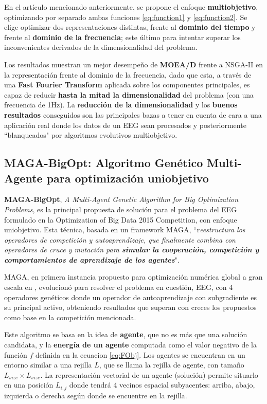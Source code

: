 En el artículo mencionado anteriormente, se propone el enfoque \textbf{multiobjetivo}, optimizando por separado ambas funciones \ref{eq:function1} y \ref{eq:function2}. Se elige optimizar dos representaciones distintas, frente al \textbf{dominio del tiempo} y frente al \textbf{dominio de la frecuencia}; este último para intentar superar los inconvenientes derivados de la dimensionalidad del problema.

Los resultados muestran un mejor desempeño de \textbf{MOEA/D} frente a NSGA-II en la representación frente al dominio de la frecuencia, dado que esta, a través de una \textbf{Fast Fourier Transform} aplicada sobre los componentes principales, es capaz de reducir \textbf{hasta la mitad la dimensionalidad} del problema (con una frecuencia de 1Hz). La r\textbf{educción de la dimensionalidad} y los\textbf{ buenos resultados} conseguidos son las principales bazas a tener en cuenta de cara a una aplicación real donde los datos de un EEG sean procesados y posteriormente ``blanqueados" por algoritmos evolutivos multiobjetivo.

\subsection{MAGA-BigOpt: Algoritmo Genético Multi-Agente para optimización uniobjetivo}

\textbf{MAGA-BigOpt}, \textit{A Multi-Agent Genetic Algorithm for Big Optimization Problems}\cite{MAGA-BigOpt}, es la principal propuesta de solución para el problema del EEG formulado en la Optimization of Big Data 2015 Competition, con enfoque uniobjetivo. Esta técnica, basada en un framework MAGA, ``r\textit{eestructura los operadores de competición y autoaprendizaje, que finalmente combina con operadores de cruce y mutación para \textbf{simular la cooperación, competición y comportamientos de aprendizaje de los agentes}}".

MAGA, en primera instancia propuesto para optimización numérica global a gran escala en\cite{MAGA} , evolucionó para resolver el problema en cuestión, EEG, con 4 operadores genéticos donde un operador de autoaprendizaje con subgradiente es su principal activo, obteniendo resultados que superan con creces los propuestos como base en la competición mencionada.

Este algoritmo se basa en la idea de \textbf{agente}, que no es más que una solución candidata, y la \textbf{energía de un agente} computada como el valor negativo de la función $f$ definida en la ecuacion \ref{eq:FObj}. Los agentes se encuentran en un entorno similar a una rejilla $L$, que se llama la rejilla de agente, con tamaño $L_{size}\times L_{size}$. La representación vectorial de un agente (solución) permite situarlo en una posición $L_{i,j}$ donde tendrá 4 vecinos espacial subyacentes: arriba, abajo, izquierda o derecha según donde se encuentre en la rejilla. 

